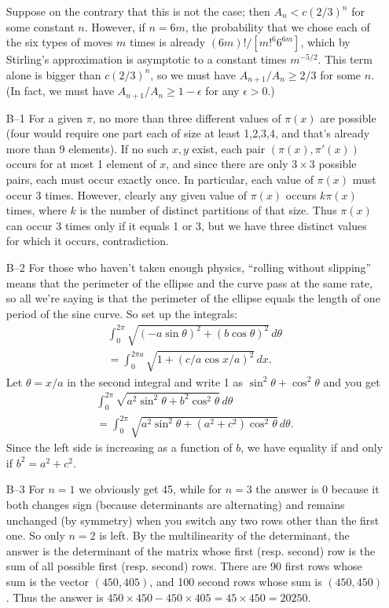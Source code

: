\documentclass[amssymb,twocolumn,pra,10pt,aps]{revtex4-1}
\begin{document}
\begin{itemize}
Suppose on the contrary that this is not the case; then $A_{n} < c
(2/3)^{n}$ for some constant $n$. However, if $n=6m$, the probability
that we chose each of the six types of moves $m$ times is already
$(6m)!/[m!^{6} 6^{6m}]$, which by Stirling's approximation is
asymptotic to a constant times $m^{-5/2}$. This term alone is bigger
than $c (2/3)^{n}$, so we must have $A_{n+1}/A_{n} \geq 2/3$ for
some $n$. (In fact, we must have $A_{n+1}/A_{n} \geq 1-\epsilon$ for
any $\epsilon>0$.)

\item[B--1]  For a given $\pi$, no more than three different values of $\pi(x)$
are possible (four would require one part each of size at least
1,2,3,4, and that's already more than 9 elements). If no such $x, y$
exist, each pair $(\pi(x), \pi'(x))$ occurs for at most 1 element of
$x$, and
since there are only $3 \times 3$ possible pairs, each must occur
exactly once. In particular, each value of $\pi(x)$ must occur 3
times. However, clearly any given value of $\pi(x)$ occurs $k\pi(x)$
times, where $k$ is the number of distinct partitions of that size.
Thus $\pi(x)$ can occur 3 times only if it equals 1 or 3, but we have
three distinct values for which it occurs, contradiction.

\item[B--2]
For those who haven't taken enough physics, ``rolling without
slipping'' means that the perimeter of the ellipse and the curve pass
at the same rate, so all we're saying is that the perimeter of the
ellipse equals the length of one period of the sine curve. So set up
the integrals:
\begin{multline*}
\int_{0}^{2\pi} \sqrt{(-a \sin \theta)^{2} + (b \cos \theta)^{2}}\,
d\theta\\
 = \int_{0}^{2\pi a} \sqrt{1 + (c/a \cos x/a)^{2}}\,dx.
\end{multline*}
Let $\theta = x/a$ in the second integral and write 1 as $\sin^{2}
\theta + \cos^{2} \theta$ and you get
\begin{multline*}
\int_{0}^{2\pi} \sqrt{a^{2} \sin^{2} \theta + b^{2} \cos^{2}
\theta}\,d\theta\\
 = \int_{0}^{2\pi} \sqrt{a^{2} \sin^{2} \theta +
(a^{2} + c^{2}) \cos^{2} \theta}\,d\theta.
\end{multline*}
Since the left side is increasing as a function of $b$, we have
equality if and only if $b^{2} = a^{2} + c^{2}$.

\item[B--3]
For $n=1$ we obviously get 45, while for $n=3$ the answer is 0
because it both changes sign (because determinants are alternating)
and remains unchanged (by symmetry) when you switch any two rows other
than the first one. So only $n=2$ is left. By the multilinearity of
the determinant, the answer is the determinant of the matrix whose
first (resp. second) row is the sum of all possible first (resp.
second) rows. There are 90 first rows whose sum is the vector $(450,
405)$, and 100 second rows whose sum is $(450, 450)$. Thus the answer
is $450\times 450 - 450 \times 405 = 45 \times 450 = 20250.$


\end{itemize}
\end{document}
